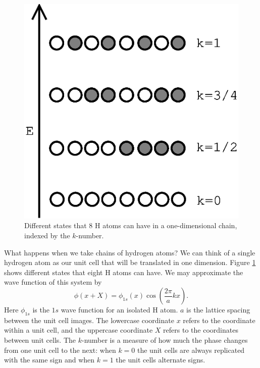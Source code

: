 \begin{figure}
\begin{center}
\includegraphics[scale=0.5]{1d-chains.eps}
\caption{Different states that 8 H atoms can have in a one-dimensional
chain, indexed by the $k$-number.}
\label{1d-chains}
\end{center}
\end{figure}

What happens when we take chains of hydrogen atoms? We can think of a
single hydrogen atom as our unit cell that will be translated in one
dimension. Figure \ref{1d-chains} shows different states that eight H
atoms can have. We may approximate the wave function of this system by
\begin{equation}
 \phi(x+X) = \phi_{1s}(x)\cos\left(\frac{2\pi}{a}kx\right).
\label{h-bloch}
\end{equation}
Here $\phi_{1s}$ is the $1s$ wave function for an isolated H atom. $a$
is the lattice spacing between the unit cell images. The
lowercase coordinate $x$ refers to the coordinate within a unit cell,
and the uppercase coordinate $X$ refers to the coordinates between
unit cells. The $k$-number is a measure of how much the phase changes
from one unit cell to the next: when $k=0$ the unit cells are always
replicated with the same sign and when $k=1$ the unit cells alternate
signs. 

